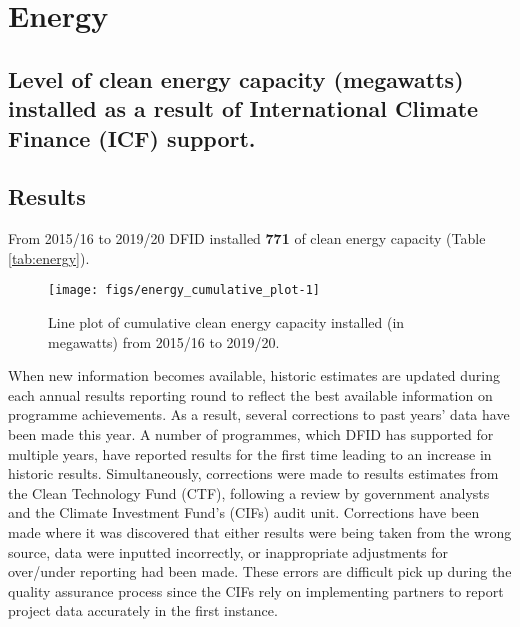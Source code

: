 \chapter{Energy}

\section*{Level of clean energy capacity (megawatts) installed as a result of International Climate Finance (ICF) support.}

\thispagestyle{empty}



\section{Results}

From 2015/16 to 2019/20 DFID installed \textbf{
771
} of clean energy capacity (Table \ref{tab:energy}). %

\begin{figure}[htbp]
	\centering
\begin{knitrout}
\color{fgcolor}
\texttt{[image: figs/energy\_cumulative\_plot-1]} 

\end{knitrout}
	\caption{Line plot of cumulative clean energy capacity installed (in megawatts) from 2015/16 to 2019/20.}
	\label{fig:energy_cumulative_plot}
\end{figure}

When new information becomes available, historic estimates are updated during each annual results reporting round to reflect the best available information on programme achievements. %
As a result, several corrections to past years' data have been made this year. %
A number of programmes, which DFID has supported for multiple years, have reported results for the first time leading to an increase in historic results. %
Simultaneously, corrections were made to results estimates from the Clean Technology Fund (CTF), following a review by government analysts and the Climate Investment Fund's (CIFs) audit unit.  %
Corrections have been made where it was discovered that either results were being taken from the wrong source, data were inputted incorrectly, or inappropriate adjustments for over/under reporting had been made. %
These errors are difficult pick up during the quality assurance process since the CIFs rely on implementing partners to report project data accurately in the first instance. %


